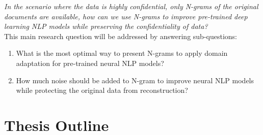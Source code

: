 \textit{In the scenario where the data is highly confidential, only N-grams of the original documents are available, how can we use N-grams to improve pre-trained deep learning NLP models while preserving the confidentiality of data?}\\ 


\noindent This main research question will be addressed by answering sub-questions:
\begin{enumerate}
    \item What is the most optimal way to present N-grams to apply domain adaptation for pre-trained neural NLP models? 
    \item How much noise should be added to N-gram to improve neural NLP models while protecting the original data from reconstruction?
\end{enumerate}
\section{Thesis Outline}\label{section:thesis_outline}
